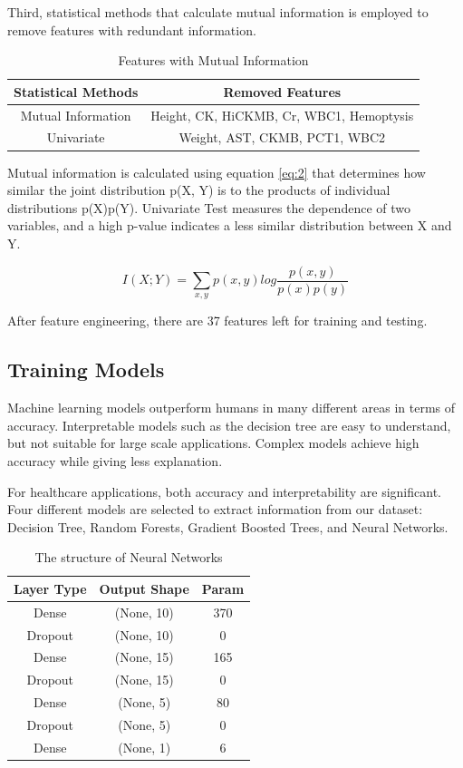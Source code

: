 Third, statistical methods that calculate mutual information is employed to remove features with redundant information.

\begin{table}[H]
\centering
\begin{tabular}{@{}cc@{}}
\toprule
Statistical Methods & Removed Features \\ \midrule
Mutual Information & Height, CK, HiCKMB, Cr, WBC1, Hemoptysis      \\
Univariate & Weight, AST, CKMB, PCT1, WBC2        \\  \bottomrule
\end{tabular}
\caption{Features with Mutual Information}
\end{table}

Mutual information is calculated using equation \ref{eq:2} that determines how similar the joint distribution p(X, Y) is to the products of individual distributions p(X)p(Y). Univariate Test measures the dependence of two variables, and a high p-value indicates a less similar distribution between X and Y. 

\begin{equation}
    I(X;Y)=\sum_{x,y}p(x, y)log\frac{p(x,y)}{p(x)p(y)} \label{eq:2}
\end{equation}

\par
After feature engineering, there are 37 features left for training and testing.

\subsection{Training Models}

Machine learning models outperform humans in many different areas in terms of accuracy. Interpretable models such as the decision tree are easy to understand, but not suitable for large scale applications. Complex models achieve high accuracy while giving less explanation. 

For healthcare applications, both accuracy and interpretability are significant. Four different models are selected to extract information from our dataset: Decision Tree, Random Forests, Gradient Boosted Trees, and Neural Networks.

\begin{table}[H]
\centering
\begin{tabular}{@{}ccc@{}}
\toprule
Layer Type   & Output Shape & Param \\ \midrule
Dense & (None, 10) & 370           \\
Dropout & (None, 10) & 0           \\
Dense & (None, 15) & 165           \\
Dropout & (None, 15) & 0           \\
Dense & (None, 5) & 80           \\
Dropout & (None, 5) & 0           \\
Dense & (None, 1) & 6           \\
\bottomrule
\end{tabular}
\caption{The structure of Neural Networks}
\label{tab:nn}
\end{table}

